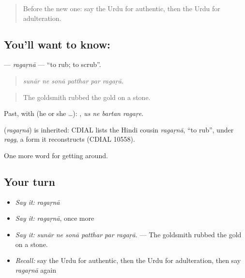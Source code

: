 \label{lesson:UR-C426-ragarna}



\begin{quote}
Before the new one: say the Urdu for authentic, then the Urdu for adulteration.
\end{quote}

\subsection*{You'll want to know: }
\textbf{} — \emph{ragaṛnā} — \textquotedblleft{}to rub; to scrub\textquotedblright{}.

\begin{quote}
     
\end{quote}

\begin{quote}
\emph{sunār ne sonā patthar par ragaṛā.}
\end{quote}

\begin{quote}
The goldsmith rubbed the gold on a stone.
\end{quote}

Past, with  (he or she …):    , \emph{us ne bartan ragaṛe}.

\begin{cousinweb}
\textbf{} (\emph{ragaṛnā}) is inherited: CDIAL lists the Hindi cousin \emph{ragaṛnā}, \textquotedblleft{}to rub\textquotedblright{}, under \emph{ragg}, a form it reconstructs (CDIAL 10558).
\end{cousinweb}

\begin{grammarlens}[title={What you've built}]
One more word for getting around.
\end{grammarlens}

\subsection*{Your turn}
\begin{itemize}
\raggedright
  \item \emph{Say it:} \emph{ragaṛnā}
  \item \emph{Say it:} \emph{ragaṛnā}, once more
  \item \emph{Say it:} \emph{sunār ne sonā patthar par ragaṛā.} — The goldsmith rubbed the gold on a stone.
  \item \emph{Recall:} say the Urdu for authentic, then the Urdu for adulteration, then say \emph{ragaṛnā} again
\end{itemize}


